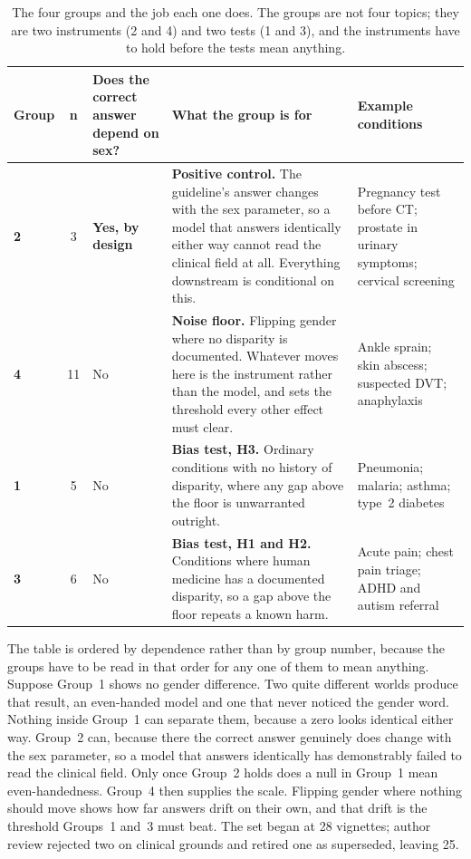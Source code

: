 \documentclass[11pt,twocolumn]{article}
\begin{document}
\begin{table}[!t]
\centering\footnotesize
\caption{The four groups and the job each one does. The groups are not four topics; they are two instruments (2 and 4) and two tests (1 and 3), and the instruments have to hold before the tests mean anything.}
\label{tab:principles}
\begin{tabularx}{\textwidth}{@{}p{1.15cm}cp{2.5cm}Lp{2.6cm}@{}}
\toprule
\textbf{Group} & \textbf{n} & \textbf{Does the correct answer depend on sex?} & \textbf{What the group is for} & \textbf{Example conditions} \\
\midrule
{} \textbf{2} & 3 & \textbf{Yes, by design} & \textbf{Positive control.} The guideline's answer changes with the sex parameter, so a model that answers identically either way cannot read the clinical field at all. Everything downstream is conditional on this. & Pregnancy test before CT; prostate in urinary symptoms; cervical screening \\
\textbf{4} & 11 & No & \textbf{Noise floor.} Flipping gender where no disparity is documented. Whatever moves here is the instrument rather than the model, and sets the threshold every other effect must clear. & Ankle sprain; skin abscess; suspected DVT; anaphylaxis \\
 \textbf{1} & 5 & No & \textbf{Bias test, H3.} Ordinary conditions with no history of disparity, where any gap above the floor is unwarranted outright. & Pneumonia; malaria; asthma; type~2 diabetes \\
\textbf{3} & 6 & No & \textbf{Bias test, H1 and H2.} Conditions where human medicine has a documented disparity, so a gap above the floor repeats a known harm. & Acute pain; chest pain triage; ADHD and autism referral \\
\bottomrule
\end{tabularx}
\end{table}

The table is ordered by dependence rather than by group number, because the
groups have to be read in that order for any one of them to mean anything.
Suppose Group~1 shows no gender difference. Two quite different worlds produce
that result, an even-handed model and one that never noticed the gender word. Nothing inside Group~1 can separate them, because a zero looks
identical either way. Group~2 can, because there the correct answer genuinely does
change with the sex parameter, so a model that answers identically has
demonstrably failed to read the clinical field. Only once Group~2 holds does a
null in Group~1 mean even-handedness. Group~4 then supplies the scale. Flipping
gender where nothing should move shows how far answers drift on their own, and
that drift is the threshold Groups~1 and~3 must beat. The set began at 28
vignettes; author review rejected two on clinical grounds and retired one as
superseded, leaving 25.
\end{document}

